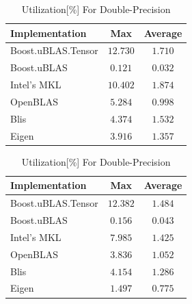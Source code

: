 \begin{table}[ht]
    \centering
    \caption{Utilization[\%] For Single-Precision}
    \begin{tabular}{|l|c|c|}
        \hline
        \textbf{Implementation} & \textbf{Max} & \textbf{Average}\\
        \hline
        Boost.uBLAS.Tensor  & $12.730$& $1.710$ \\
        \hline
        Boost.uBLAS         & $0.121$& $0.032$ \\
        \hline
        Intel's MKL         & $10.402$& $1.874$ \\
        \hline
        OpenBLAS            & $5.284$& $0.998$ \\
        \hline
        Blis                & $4.374$& $1.532$ \\
        \hline
        Eigen               & $3.916$& $1.357$ \\
        \hline
    \end{tabular}

    \vspace*{1 cm}

    \centering
    \caption{Utilization[\%] For Double-Precision}
    \begin{tabular}{|l|c|c|}
        \hline
        \textbf{Implementation} & \textbf{Max} & \textbf{Average}\\
        \hline
        Boost.uBLAS.Tensor  & $12.382$ & $1.484$ \\
        \hline
        Boost.uBLAS         & $0.156$ & $0.043$ \\
        \hline
        Intel's MKL         & $7.985$ & $1.425$ \\
        \hline
        OpenBLAS            & $3.836$ & $1.052$ \\
        \hline
        Blis                & $4.154$ & $1.286$ \\
        \hline
        Eigen               & $1.497$ & $0.775$ \\
        \hline
    \end{tabular}
\end{table}

